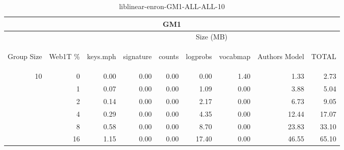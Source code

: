 \begin{center}
\begin{table}[htbp]
\begin{tabular}{ | r | r | r | r | r | r | r | r | r |}
\hline
\multicolumn{9}{|c|}{GM1}\\
\hline
 & & \multicolumn{7}{|c|}{Size (MB)}\\ \cline{3-9}
\begin{sideways}Group Size\end{sideways} & \begin{sideways}Web1T \% \end{sideways} & \begin{sideways}keys.mph\end{sideways} & \begin{sideways}signature\end{sideways} & \begin{sideways}counts\end{sideways} & \begin{sideways}logprobs\end{sideways} & \begin{sideways}vocabmap\end{sideways} & \begin{sideways}Authors Model \end{sideways} & \begin{sideways}TOTAL\end{sideways}\\
\hline
\multirow{5}{*}{10}
 & 0 & 0.00 & 0.00 & 0.00 & 0.00 & 1.40 & 1.33 & 2.73\\ \cline{2-9}
 & 1 & 0.07 & 0.00 & 0.00 & 1.09 & 0.00 & 3.88 & 5.04\\ \cline{2-9}
 & 2 & 0.14 & 0.00 & 0.00 & 2.17 & 0.00 & 6.73 & 9.05\\ \cline{2-9}
 & 4 & 0.29 & 0.00 & 0.00 & 4.35 & 0.00 & 12.44 & 17.07\\ \cline{2-9}
 & 8 & 0.58 & 0.00 & 0.00 & 8.70 & 0.00 & 23.83 & 33.10\\ \cline{2-9}
 & 16 & 1.15 & 0.00 & 0.00 & 17.40 & 0.00 & 46.55 & 65.10\\ \cline{2-9}
\hline
\end{tabular}
\caption{liblinear-enron-GM1-ALL-ALL-10}
\label{table:liblinear-enron-GM1-ALL-ALL-10}
\end{table}
\end{center}


